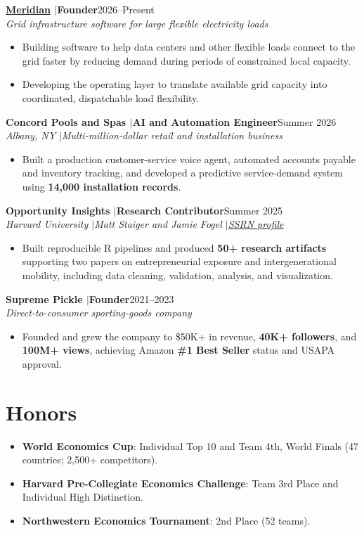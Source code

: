 \documentclass[10pt,letterpaper]{article}
\newcommand{\sep}{\enspace\textcolor{gray!60}{$|$}\enspace}
\newcommand{\entry}[3]{%
  \textbf{#1}\hfill{\small #2}\\[-1pt]
  {\small\textit{#3}}\par
}
\begin{document}
\entry{\href{https://meridian.kianfoshee.com}{Meridian} \sep Founder}{2026--Present}{Grid infrastructure software for large flexible electricity loads}
\begin{itemize}
  \item Building software to help data centers and other flexible loads connect to the grid faster by reducing demand during periods of constrained local capacity.
  \item Developing the operating layer to translate available grid capacity into coordinated, dispatchable load flexibility.
\end{itemize}

\vspace{3pt}
\entry{Concord Pools and Spas \sep AI and Automation Engineer}{Summer 2026}{Albany, NY \sep Multi-million-dollar retail and installation business}
\begin{itemize}
  \item Built a production customer-service voice agent, automated accounts payable and inventory tracking, and developed a predictive service-demand system using \textbf{14,000 installation records}.
\end{itemize}

\vspace{3pt}
\entry{Opportunity Insights \sep Research Contributor}{Summer 2025}{Harvard University \sep Matt Staiger and Jamie Fogel \sep \href{https://papers.ssrn.com/sol3/cf_dev/AbsByAuth.cfm?per_id=8481368}{SSRN profile}}
\begin{itemize}
  \item Built reproducible R pipelines and produced \textbf{50+ research artifacts} supporting two papers on entrepreneurial exposure and intergenerational mobility, including data cleaning, validation, analysis, and visualization.
\end{itemize}

\vspace{3pt}
\entry{Supreme Pickle \sep Founder}{2021--2023}{Direct-to-consumer sporting-goods company}
\begin{itemize}
  \item Founded and grew the company to \$50K+ in revenue, \textbf{40K+ followers}, and \textbf{100M+ views}, achieving Amazon \textbf{\#1 Best Seller} status and USAPA approval.
\end{itemize}

\section{Honors}

\begin{itemize}
  \item \textbf{World Economics Cup}: Individual Top 10 and Team 4th, World Finals {\small (47 countries; 2,500+ competitors)}.
  \item \textbf{Harvard Pre-Collegiate Economics Challenge}: Team 3rd Place and Individual High Distinction.
  \item \textbf{Northwestern Economics Tournament}: 2nd Place {\small (52 teams)}.
\end{itemize}
\end{document}
